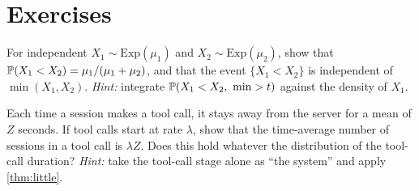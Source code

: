 \section{Exercises}

\begin{exercise}\label{L1:exr:race}
For independent $X_1\sim\mathrm{Exp}(\mu_1)$ and $X_2\sim\mathrm{Exp}(\mu_2)$, show that
$\mathbb{P}(X_1<X_2)=\mu_1/(\mu_1+\mu_2)$, and that the event $\{X_1<X_2\}$ is independent
of $\min(X_1,X_2)$.
\emph{Hint:} integrate $\Prob(X_1<X_2,\ \min>t)$ against the density of $X_1$.
\end{exercise}

\begin{exercise}\label{L1:exr:delay}
Each time a session makes a tool call, it stays away from the server for a mean of $Z$
seconds. If tool calls start at rate $\lambda$, show that the time-average number of
sessions in a tool call is $\lambda Z$. Does this hold whatever the distribution of the
tool-call duration?
\emph{Hint:} take the tool-call stage alone as ``the system'' and apply
\cref{thm:little}.
\end{exercise}
